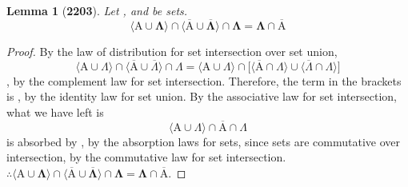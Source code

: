 \documentclass[preview]{standalone}
\newtheorem*{lemma*}{Lemma}
\begin{document}
\begin{lemma*}[\textbf{2203}] \color{black}
    Let , and \bm{$\Lambda$} be sets.
    \begin{equation*}
        \bm{
            \Big \langle \mathrm{A} \cup \Lambda \Big \rangle
                \cap
            \Big \langle 
                \overline{\mathrm{A}} 
                    \cup 
                \overline{\Lambda} 
            \Big \rangle
                \cap
            \Lambda
                =
            \Lambda \cap \overline{\mathrm{A}}
        }
    \end{equation*}
\end{lemma*}
\begin{proof} \color{black}
    By the law of distribution for set intersection over set union,
    \begin{equation*}
        \Big \langle \mathrm{A} \cup \Lambda \Big \rangle
            \cap
        \Big \langle 
            \overline{\mathrm{A}} 
                \cup 
            \overline{\Lambda} 
        \Big \rangle
            \cap
        \Lambda
            =
        \Big \langle \mathrm{A} \cup \Lambda \Big \rangle
            \cap
        \bigg[
            \Big \langle \overline{\mathrm{A}} \cap \Lambda \Big \rangle
                \cup
            \Big \langle \overline{\Lambda} \cap \Lambda \Big \rangle
        \bigg]
    \end{equation*}
    \bm{$\overline{\Lambda} \cap \Lambda \equiv \varnothing$}, 
    by the complement law for set intersection. 
    Therefore, the term in the brackets is ,
    by the identity law for set union. By the associative law for set intersection, what we have left is
    \begin{equation*}
        \Big \langle \mathrm{A} \cup \Lambda \Big \rangle
            \cap
        \overline{\mathrm{A}}
            \cap
        \Lambda
    \end{equation*}
     is absorbed by \bm{$\Lambda$}, 
    by the absorption laws for sets, 
    since sets are commutative over intersection, 
    by the commutative law for set intersection.
    $\therefore \text{} \bm{
        \big \langle \mathrm{A} \cup \Lambda \big \rangle
            \cap
        \big \langle 
            \overline{\mathrm{A}} 
                \cup 
            \overline{\Lambda} 
        \big \rangle
            \cap
        \Lambda
            =
        \Lambda \cap \overline{\mathrm{A}}
    }$. 
\color{lightgray} \end{proof}
\end{document}
